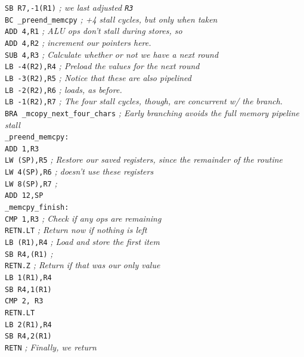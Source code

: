 \documentclass{gqtekspec}
\begin{document}
\begin{table}
\begin{center}
{{\begin{tabbing}
\>	{\tt SB  R7,-1(R1)}	\> {\em ; we last adjusted {\tt R3}}\\
\>	{\tt BC  \_preend\_memcpy} \> {\em ; +4 stall cycles, but only when taken}\\
\>	{\tt ADD  4,R1}	\> {\em ; ALU ops don't stall during stores, so}\\
\>	{\tt ADD  4,R2}	\> {\em ; increment our pointers here.} \\
\>	{\tt SUB  4,R3} \> {\em ; Calculate whether or not we have a next round}\\
\>	{\tt LB  -4(R2),R4} \>	{\em ; Preload the values for the next round}\\
\>	{\tt LB  -3(R2),R5}\>	{\em ; Notice that these are also pipelined}\\
\>	{\tt LB  -2(R2),R6}\>	{\em ; loads, as before.}\\
\>	{\tt LB  -1(R2),R7}\>  {\em ; The four stall cycles, though, are concurrent w/ the branch.}\\
\>	{\tt BRA  \_mcopy\_next\_four\_chars}\hspace{0.25in} {\em ; Early branching avoids the full memory pipeline stall} \\
{\tt \_preend\_memcpy:}\\
\>	{\tt ADD  1,R3}	\\
\>	{\tt LW (SP),R5}  \> {\em ; Restore our saved registers, since the remainder of the routine}\\
\>	{\tt LW 4(SP),R6} \> {\em ; doesn't use these registers}\\
\>	{\tt LW 8(SP),R7} \> {\em ;}\\
\>	{\tt ADD 12,SP}	\\
{\tt \_memcpy\_finish:}\>\\
\>	{\tt CMP 1,R3} \> {\em ; Check if any ops are remaining }\\
\>	{\tt RETN.LT} \> {\em ; Return now if nothing is left}\\
\>	{\tt LB (R1),R4} \> {\em ; Load and store the first item}\\
\>	{\tt SB R4,(R1)} \> {\em ;}\\
\>	{\tt RETN.Z}	\> {\em ; Return if that was our only value}\\
\>	{\tt LB 1(R1),R4} \\
\>	{\tt SB R4,1(R1)}\\
\>	{\tt CMP 2, R3}\\
\>	{\tt RETN.LT}\\
\>	{\tt LB 2(R1),R4} \\
\>	{\tt SB R4,2(R1)}\\
\>	{\tt RETN} \> {\em ; Finally, we return}\\
\end{tabbing}}}
\caption{Example Memory Copy code in Zip Assembly, Hand Optimized}\label{tbl:memcp-opt}
\end{center}\end{table}
\end{document}

